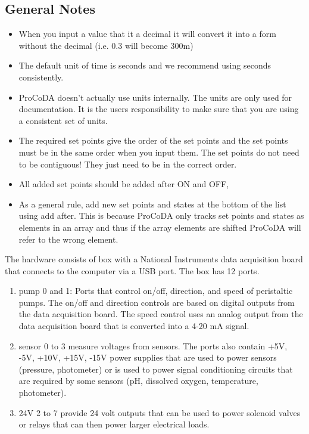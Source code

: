 \documentclass[letterpaper,10pt,english]{sphinxmanual}
\begin{document}
\subsection{General Notes}
\label{\detokenize{ProCoDA/ProCoDA:general-notes}}\begin{itemize}
\item {} 
When you input a value that it a decimal it will convert it into a form without the decimal (i.e. 0.3 will become 300m)

\item {} 
The default unit of time is seconds and we recommend using seconds consistently.

\item {} 
ProCoDA doesn’t actually use units internally. The units are only used for documentation. It is the users responsibility to make sure that you are using a consistent set of units.

\item {} 
The required set points give the order of the set points and the set points must be in the same order when you input them. The set points do not need to be contiguous! They just need to be in the correct order.

\item {} 
All added set points should be added after ON and OFF,

\item {} 
As a general rule, add new set points and states at the bottom of the list using add after. This is because ProCoDA only tracks set points and states as elements in an array and thus if the array elements are shifted ProCoDA will refer to the wrong element.

\end{itemize}

The hardware consists of box with a National Instruments data acquisition board that connects to the computer via a USB port. The box has 12 ports.
\begin{enumerate}
\item {} 
pump 0 and 1: Ports that control on/off, direction, and speed of peristaltic pumps. The on/off and direction controls are based on digital outputs from the data acquisition board. The speed control uses an analog output from the data acquisition board that is converted into a 4-20 mA signal.

\item {} 
sensor 0 to 3 measure voltages from sensors. The ports also contain +5V, -5V, +10V, +15V, -15V power supplies that are used to power sensors (pressure, photometer) or is used to power signal conditioning circuits that are required by some sensors (pH, dissolved oxygen, temperature, photometer).

\item {} 
24V 2 to 7 provide 24 volt outputs that can be used to power solenoid valves or relays that can then power larger electrical loads.

\end{enumerate}
\end{document}
